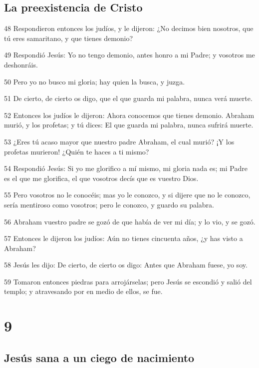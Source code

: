 \section*{La preexistencia de Cristo}

\par 48 Respondieron entonces los judíos, y le dijeron: ¿No decimos bien nosotros, que tú eres samaritano, y que tienes demonio?
\par 49 Respondió Jesús: Yo no tengo demonio, antes honro a mi Padre; y vosotros me deshonráis.
\par 50 Pero yo no busco mi gloria; hay quien la busca, y juzga.
\par 51 De cierto, de cierto os digo, que el que guarda mi palabra, nunca verá muerte.
\par 52 Entonces los judíos le dijeron: Ahora conocemos que tienes demonio. Abraham murió, y los profetas; y tú dices: El que guarda mi palabra, nunca sufrirá muerte.
\par 53 ¿Eres tú acaso mayor que nuestro padre Abraham, el cual murió? ¡Y los profetas murieron! ¿Quién te haces a ti mismo?
\par 54 Respondió Jesús: Si yo me glorifico a mí mismo, mi gloria nada es; mi Padre es el que me glorifica, el que vosotros decís que es vuestro Dios.
\par 55 Pero vosotros no le conocéis; mas yo le conozco, y si dijere que no le conozco, sería mentiroso como vosotros; pero le conozco, y guardo su palabra.
\par 56 Abraham vuestro padre se gozó de que había de ver mi día; y lo vio, y se gozó.
\par 57 Entonces le dijeron los judíos: Aún no tienes cincuenta años, ¿y has visto a Abraham?
\par 58 Jesús les dijo: De cierto, de cierto os digo: Antes que Abraham fuese, yo soy.
\par 59 Tomaron entonces piedras para arrojárselas; pero Jesús se escondió y salió del templo; y atravesando por en medio de ellos, se fue.

\chapter{9}

\section*{Jesús sana a un ciego de nacimiento}

